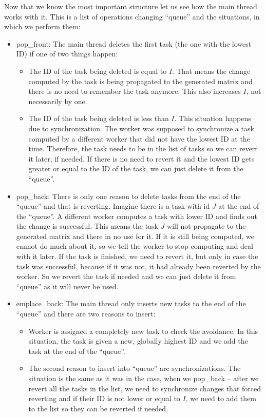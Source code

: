 Now that we know the most important structure let us see how the main thread works with it. This is a list of operations changing ``queue'' and the situations, in which we perform them:
\begin{itemize}
\item pop\_front: The main thread deletes the first task (the one with the lowest ID) if one of two things happen:
\begin{itemize}
\item The ID of the task being deleted is equal to $I$. That means the change computed by the task is being propagated to the generated matrix and there is no need to remember the task anymore. This also increases $I$, not necessarily by one.
\item The ID of the task being deleted is less than $I$. This situation happens due to synchronization. The worker was supposed to synchronize a task computed by a different worker that did not have the lowest ID at the time. Therefore, the task needs to be in the list of tasks so we can revert it later, if needed. If there is no need to revert it and the lowest ID gets greater or equal to the ID of the task, we can just delete it from the ``queue''.
\end{itemize}
\item pop\_back: There is only one reason to delete tasks from the end of the ``queue'' and that is reverting. Imagine there is a task with id $J$ at the end of the ``queue''. A different worker computes a task with lower ID and finds out the change is successful. This means the task $J$ will not propagate to the generated matrix and there in no use for it. If it is still being computed, we cannot do much about it, so we tell the worker to stop computing and deal with it later. If the task is finished, we need to revert it, but only in case the task was successful, because if it was not, it had already been reverted by the worker. So we revert the task if needed and we can just delete it from ``queue'' as it will never be used.
\item emplace\_back: The main thread only inserts new tasks to the end of the ``queue'' and there are two reasons to insert:
\begin{itemize}
\item Worker is assigned a completely new task to check the avoidance. In this situation, the task is given a new, globally highest ID and we add the task at the end of the ``queue''.
\item The second reason to insert into ``queue'' are synchronizations. The situation is the same as it was in the case, when we pop\_back -- after we revert all the tasks in the list, we need to synchronize changes that forced reverting and if their ID is not lower or equal to $I$, we need to add them to the list so they can be reverted if needed.
\end{itemize}
\end{itemize}